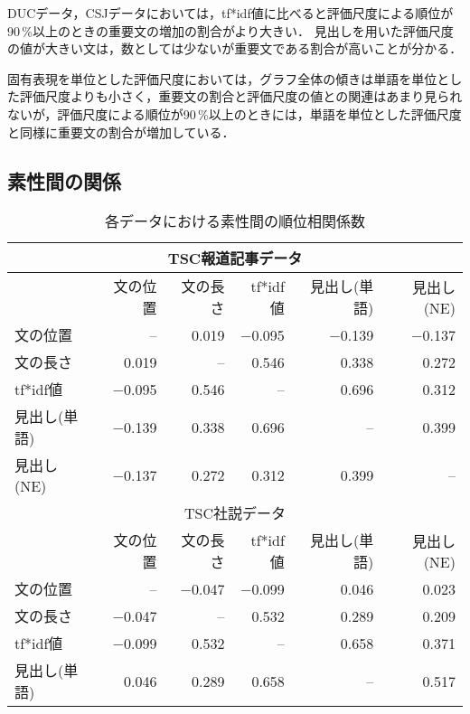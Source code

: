 DUCデータ，CSJデータにおいては，tf*idf値に比べると評価尺度による順位が90\,\%以上のときの重要文の増加の割合がより大きい．
見出しを用いた評価尺度の値が大きい文は，数としては少ないが重要文である割合が高いことが分かる．

固有表現を単位とした評価尺度においては，グラフ全体の傾きは単語を単位とした評価尺度よりも小さく，重要文の割合と評価尺度の値との関連はあまり見られないが，評価尺度による順位が90\,\%以上のときには，単語を単位とした評価尺度と同様に重要文の割合が増加している．

\subsection{素性間の関係}

\begin{table}[t]\small
\caption{各データにおける素性間の順位相関係数}
\label{rank_cc_results}
\begin{center}
\begin{tabular}{l|rrrrr} \hline \hline
\multicolumn{6}{c}{TSC報道記事データ} \\ \hline
             & 文の位置 & 文の長さ & tf*idf値 & 見出し(単語) & 見出し(NE) \\ \hline
文の位置     & --       & 0.019    & $-$0.095   & $-$0.139       & $-$0.137     \\       
文の長さ     & 0.019    & --       & 0.546    & 0.338        & 0.272      \\       
tf*idf値     & $-$0.095   & 0.546    & --       & 0.696        & 0.312      \\       
見出し(単語) & $-$0.139   & 0.338    & 0.696    & --           & 0.399      \\       
見出し(NE)   & $-$0.137   & 0.272    & 0.312    & 0.399        & --         \\ \hline \hline
\multicolumn{6}{c}{TSC社説データ} \\ \hline
             & 文の位置 & 文の長さ & tf*idf値 & 見出し(単語) & 見出し(NE) \\ \hline
文の位置     & --       & $-$0.047   & $-$0.099   & 0.046        & 0.023      \\       
文の長さ     & $-$0.047   & --       & 0.532    & 0.289        & 0.209      \\       
tf*idf値     & $-$0.099   & 0.532    & --       & 0.658        & 0.371      \\       
見出し(単語) & 0.046    & 0.289    & 0.658    & --           & 0.517      \\       

\end{tabular}
\end{center}
\end{table}
